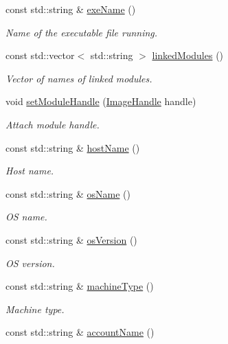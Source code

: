 \begin{DoxyCompactItemize}
const std\+::string \& \hyperlink{namespaceSystem_aff38aaecd202e69eab2707a36adc8df8}{exe\+Name} ()
\begin{DoxyCompactList}\small\item\em Name of the executable file running. \end{DoxyCompactList}\item 
const std\+::vector$<$ std\+::string $>$ \hyperlink{namespaceSystem_af1b504f8287b1957eeab91fb89cbd56f}{linked\+Modules} ()
\begin{DoxyCompactList}\small\item\em Vector of names of linked modules. \end{DoxyCompactList}\item 
void \hyperlink{namespaceSystem_af2318f71452b7e844f0b654a8bd93018}{set\+Module\+Handle} (\hyperlink{namespaceSystem_a21dca3f6170a2b0a0ea3028040ba21b3}{Image\+Handle} handle)
\begin{DoxyCompactList}\small\item\em Attach module handle. \end{DoxyCompactList}\item 
const std\+::string \& \hyperlink{namespaceSystem_a89320a729880098922e8b505db1137ec}{host\+Name} ()
\begin{DoxyCompactList}\small\item\em Host name. \end{DoxyCompactList}\item 
const std\+::string \& \hyperlink{namespaceSystem_a08f605cda93733c3b7593517ed18557c}{os\+Name} ()
\begin{DoxyCompactList}\small\item\em OS name. \end{DoxyCompactList}\item 
const std\+::string \& \hyperlink{namespaceSystem_aee568b62f9bcad983dcb3f0c30631854}{os\+Version} ()
\begin{DoxyCompactList}\small\item\em OS version. \end{DoxyCompactList}\item 
const std\+::string \& \hyperlink{namespaceSystem_a21d0ee3eb17ae5ed59b3c6c01efce8d9}{machine\+Type} ()
\begin{DoxyCompactList}\small\item\em Machine type. \end{DoxyCompactList}\item 
const std\+::string \& \hyperlink{namespaceSystem_a8a4ea73b74e0f6b8225e571e21ba4e2f}{account\+Name} ()

\end{DoxyCompactItemize}
